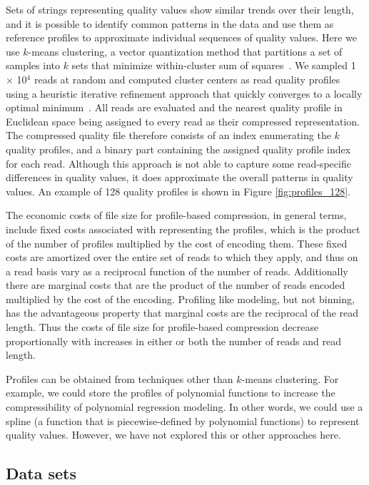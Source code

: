 \documentclass[fleqn,10pt,lineno]{wlpeerj} %
\begin{document}
Sets of strings representing quality values show similar trends over
their length, and it is possible to identify common patterns in the
data and use them as reference profiles to approximate individual
sequences of quality values. Here we use $k$-means clustering, a
vector quantization method that partitions a set of samples into $k$
sets that minimize within-cluster sum of
squares~\citep{macqueen1967some}. We sampled 1 $\times$ 10$^{4}$ reads
at random and computed cluster centers as read quality profiles using
a heuristic iterative refinement approach that quickly converges to a
locally optimal minimum~\citep{hartigan1979algorithm}. All reads are
evaluated and the nearest quality profile in Euclidean space being
assigned to every read as their compressed representation.  The
compressed quality file therefore consists of an index enumerating the
$k$ quality profiles, and a binary part containing the assigned
quality profile index for each read.  Although this approach is not
able to capture some read-specific differences in quality values, it
does approximate the overall patterns in quality values. An example of
128 quality profiles is shown in Figure \ref{fig:profiles_128}.

The economic costs of file size for profile-based compression, in
general terms, include fixed costs associated with representing the
profiles, which is the product of the number of profiles multiplied by
the cost of encoding them. These fixed costs are amortized over the
entire set of reads to which they apply, and thus on a read basis vary
as a reciprocal function of the number of reads. Additionally there
are marginal costs that are the product of the number of reads encoded
multiplied by the cost of the encoding. Profiling like modeling, but
not binning, has the advantageous property that marginal costs are the
reciprocal of the read length. Thus the costs of file size for
profile-based compression decrease proportionally with increases in
either or both the number of reads and read length.

Profiles can be obtained from techniques other than $k$-means
clustering. For example, we could store the profiles of polynomial
functions to increase the compressibility of polynomial regression
modeling. In other words, we could use a spline (a function that is
piecewise-defined by polynomial functions) to represent quality
values. However, we have not explored this or other approaches here.

\subsection*{Data sets}
\end{document}

